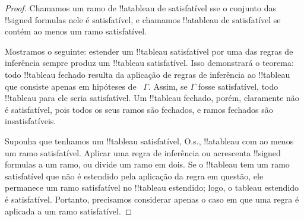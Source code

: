\documentclass[../../../include/open-logic-section]{subfiles}
\begin{document}
\begin{proof}
Chamamos um ramo de !!a{tableau} de satisfatível sse o conjunto das
!!{signed formula}s nele é satisfatível, e chamamos !!a{tableau} de
satisfatível se contém ao menos um ramo satisfatível.

Mostramos o seguinte: estender um !!{tableau} satisfatível por uma das
regras de inferência sempre produz um !!{tableau} satisfatível. Isso
demonstrará o teorema: todo !!{tableau} fechado resulta da aplicação de
regras de inferência ao !!{tableau} que consiste apenas em hipóteses de
~$\Gamma$. Assim, se $\Gamma$ fosse satisfatível, todo !!{tableau} para
ele seria satisfatível. Um !!{tableau} fechado, porém, claramente não é
satisfatível, pois todos os seus ramos são fechados, e ramos fechados são
insatisfatíveis.

Suponha que tenhamos um !!{tableau} satisfatível, O.s.\@, !!a{tableau}
com ao menos um ramo satisfatível. Aplicar uma regra de inferência ou
acrescenta !!{signed formula}s a um ramo, ou divide um ramo em dois. Se
o !!{tableau} tem um ramo satisfatível que não é estendido pela aplicação
da regra em questão, ele permanece um ramo satisfatível no !!{tableau}
estendido; logo, o tableau estendido é satisfatível. Portanto, precisamos
considerar apenas o caso em que uma regra é aplicada a um ramo satisfatível.


\end{proof}
\end{document}
